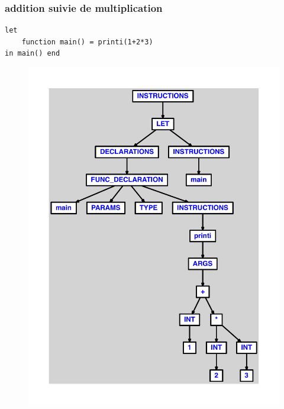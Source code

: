 \documentclass{article}
\begin{document}
\subsubsection{addition suivie de multiplication}
\begin{lstlisting}
let
	function main() = printi(1+2*3)
in main() end
\end{lstlisting}
\newpage
\begin{figure}[H]
\centering
\includegraphics[max width=\textwidth]{ast/ast_45.pdf}
\end{figure}
\newpage
\end{document}
